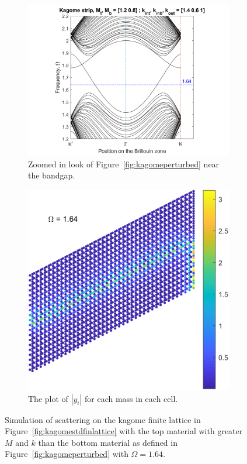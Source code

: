 \begin{figure}
\centering
\begin{subfigure}[b]{.5\textwidth}
  \centering
  \includegraphics[width=1.1\linewidth]{imgs/kagomeperturb2zoom.png}
  \caption{Zoomed in look of Figure~\ref{fig:kagomeperturbed} near the bandgap.}
  \label{fig:sub1}
\end{subfigure}%
\begin{subfigure}[b]{.5\textwidth}
  \centering
  \includegraphics[width=1\linewidth]{imgs/kagomestd.png}
  \caption{The plot of $|y_i|$ for each mass in each cell.}
  \label{fig:sub2}
\end{subfigure}
\caption{Simulation of scattering on the kagome finite lattice in
  Figure~\ref{fig:kagomestdfinlattice} with the top material with greater $M$
  and $k$ than the bottom material as defined in
  Figure~\ref{fig:kagomeperturbed} with $\Omega = 1.64$.}
\label{fig:kagomestd}
\end{figure}

